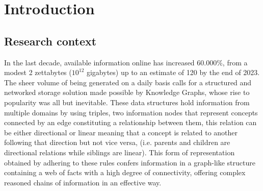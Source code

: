 \chapter{Introduction}\label{chap:introduction}



\section{Research context}\label{sec:intro-context}

In the last decade, available information online has increased 60.000\%, from a modest 2 zettabytes ($10^{12}$ gigabytes) up to an estimate of 120 by the end of 2023\cite{Marr2021}. The sheer volume of being generated on a daily basis calls for a structured and networked storage solution made possible by Knowledge Graphs, whose rise to popularity was all but inevitable. 
These data structures hold information from multiple domains by using triples, two information nodes that represent concepts connected by an edge constituting a relationship between them, this relation can be either directional or linear meaning that a concept is related to another following that direction but not vice versa, (i.e. parents and children are directional relations while siblings are linear).
This form of representation obtained by adhering to these rules confers information in a graph-like structure containing a web of facts with a high degree of connectivity, offering complex reasoned chains of information in an effective way.

